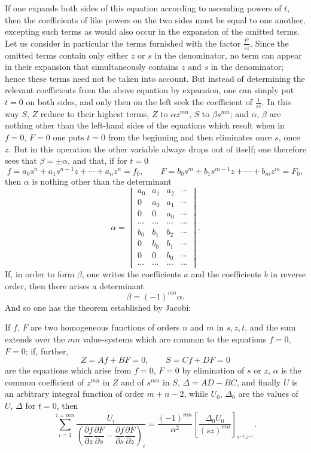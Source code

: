 \documentclass[10pt]{article}
\begin{document}
If one expands both sides of this equation according to ascending powers of $t$, then the coefficients of like powers on the two sides must be equal to one another, excepting such terms as would also occur in the expansion of the omitted terms. Let us consider in particular the terms furnished with the factor $\frac{t^0}{sz}$. Since the omitted terms contain only either $z$ or $s$ in the denominator, no term can appear in their expansion that simultaneously contains $z$ and $s$ in the denominator; hence these terms need not be taken into account. But instead of determining the relevant coefficients from the above equation by expansion, one can simply put $t=0$ on both sides, and only then on the left seek the coefficient of $\frac{1}{sz}$. In this way $S$, $Z$ reduce to their highest terms, $Z$ to $\alpha z^{mn}$, $S$ to $\beta s^{mn}$; and $\alpha$, $\beta$ are nothing other than the left-hand sides of the equations which result when in $f=0$, $F=0$ one puts $t=0$ from the beginning and then eliminates once $s$, once $z$. But in this operation the other variable always drops out of itself; one therefore sees that $\beta=\pm\alpha$, and that, if for $t=0$
\[
f=a_0s^n+a_1s^{n-1}z+\cdots+a_nz^n=f_0,
\qquad
F=b_0s^m+b_1s^{m-1}z+\cdots+b_mz^m=F_0,
\]
then $\alpha$ is nothing other than the determinant
\[
\alpha=\begin{vmatrix}
a_0&a_1&a_2&\cdots\\
0&a_0&a_1&\cdots\\
0&0&a_0&\cdots\\
\cdots&\cdots&\cdots&\cdots\\
b_0&b_1&b_2&\cdots\\
0&b_0&b_1&\cdots\\
0&0&b_0&\cdots\\
\cdots&\cdots&\cdots&\cdots
\end{vmatrix}.
\]
If, in order to form $\beta$, one writes the coefficients $a$ and the coefficients $b$ in reverse order, then there arises a determinant
\[
\beta=(-1)^{mn}\alpha.
\]
And so one has the theorem established by Jacobi:

If $f$, $F$ are two homogeneous functions of orders $n$ and $m$ in $s,z,t$, and the sum extends over the $mn$ value-systems which are common to the equations $f=0$, $F=0$; if, further,
\[
Z=Af+BF=0,
\qquad
S=Cf+DF=0
\]
are the equations which arise from $f=0$, $F=0$ by elimination of $s$ or $z$, $\alpha$ is the common coefficient of $z^{mn}$ in $Z$ and of $s^{mn}$ in $S$, $\Delta=AD-BC$, and finally $U$ is an arbitrary integral function of order $m+n-2$, while $U_0$, $\Delta_0$ are the values of $U$, $\Delta$ for $t=0$, then
\[
\sum_{i=1}^{i=mn}
\frac{U_i}{\left(\dfrac{\partial f}{\partial z}\dfrac{\partial F}{\partial s}-\dfrac{\partial f}{\partial s}\dfrac{\partial F}{\partial z}\right)_i}
=\frac{(-1)^{mn}}{\alpha^2}\left[\frac{\Delta_0U_0}{(sz)^{mn}}\right]_{s^{-1}z^{-1}}.
\]
\end{document}
